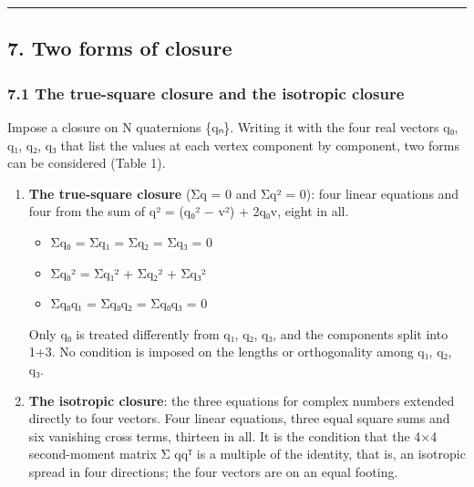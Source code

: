 \documentclass[
  a4paper,
]{article}
\providecommand{\tightlist}{%
  \setlength{\itemsep}{0pt}\setlength{\parskip}{0pt}}
\begin{document}
\begin{center}\rule{0.5\linewidth}{0.5pt}\end{center}

\subsection{7. Two forms of closure}\label{two-forms-of-closure}

\subsubsection{7.1 The true-square closure and the isotropic
closure}\label{the-true-square-closure-and-the-isotropic-closure}

Impose a closure on N quaternions \{qₙ\}. Writing it with the four real
vectors q₀, q₁, q₂, q₃ that list the values at each vertex component by
component, two forms can be considered (Table 1).

\begin{enumerate}
\def\labelenumi{\arabic{enumi}.}
\tightlist
\item
  \textbf{The true-square closure} (Σq = 0 and Σq² = 0): four linear
  equations and four from the sum of q² = (q₀² − \textbar v\textbar²) +
  2q₀v, eight in all.

  \begin{itemize}
  \tightlist
  \item
    Σq₀ = Σq₁ = Σq₂ = Σq₃ = 0
  \item
    Σq₀² = Σq₁² + Σq₂² + Σq₃²
  \item
    Σq₀q₁ = Σq₀q₂ = Σq₀q₃ = 0
  \end{itemize}

  Only q₀ is treated differently from q₁, q₂, q₃, and the components
  split into 1+3. No condition is imposed on the lengths or
  orthogonality among q₁, q₂, q₃.
\item
  \textbf{The isotropic closure}: the three equations for complex
  numbers extended directly to four vectors. Four linear equations,
  three equal square sums and six vanishing cross terms, thirteen in
  all. It is the condition that the 4×4 second-moment matrix Σ qqᵀ is a
  multiple of the identity, that is, an isotropic spread in four
  directions; the four vectors are on an equal footing.
\end{enumerate}
\end{document}
